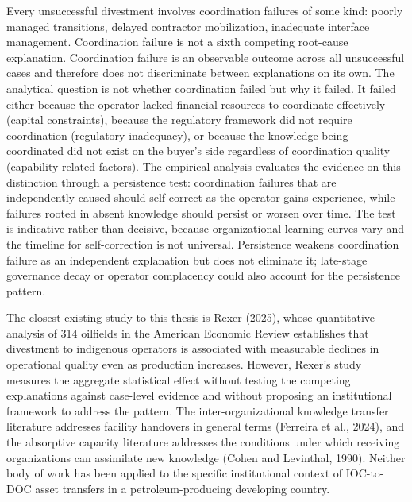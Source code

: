 \documentclass[twoside,fontset=lmodern]{mitthesis}
\begin{document}
Every unsuccessful divestment involves coordination failures of some
kind: poorly managed transitions, delayed contractor mobilization,
inadequate interface management. Coordination failure is not a sixth
competing root-cause explanation. Coordination failure is an observable
outcome across all unsuccessful cases and therefore does not
discriminate between explanations on its own. The analytical question is
not whether coordination failed but why it failed. It failed either
because the operator lacked financial resources to coordinate
effectively (capital constraints), because the regulatory framework did
not require coordination (regulatory inadequacy), or because the
knowledge being coordinated did not exist on the buyer's side regardless
of coordination quality (capability-related factors). The empirical
analysis evaluates the evidence on this distinction through a
persistence test: coordination failures that are independently caused
should self-correct as the operator gains experience, while failures
rooted in absent knowledge should persist or worsen over time. The test
is indicative rather than decisive, because organizational learning
curves vary and the timeline for self-correction is not universal.
Persistence weakens coordination failure as an independent explanation
but does not eliminate it; late-stage governance decay or operator
complacency could also account for the persistence pattern.

The closest existing study to this thesis is Rexer (2025), whose
quantitative analysis of 314 oilfields in the American Economic Review
establishes that divestment to indigenous operators is associated with
measurable declines in operational quality even as production increases.
However, Rexer's study measures the aggregate statistical effect without
testing the competing explanations against case-level evidence and
without proposing an institutional framework to address the pattern. The
inter-organizational knowledge transfer literature addresses facility
handovers in general terms (Ferreira et al., 2024), and the absorptive
capacity literature addresses the conditions under which receiving
organizations can assimilate new knowledge (Cohen and Levinthal, 1990).
Neither body of work has been applied to the specific institutional
context of IOC-to-DOC asset transfers in a petroleum-producing
developing country.
\end{document}
